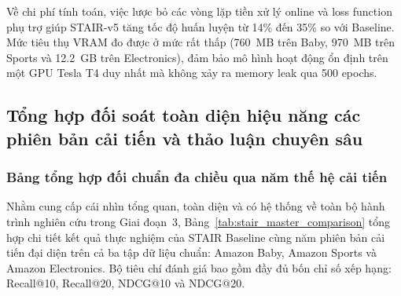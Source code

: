 Về chi phí tính toán, việc lược bỏ các vòng lặp tiền xử lý online và loss function phụ trợ giúp STAIR-v5 tăng tốc độ huấn luyện từ 14\% đến 35\% so với Baseline. Mức tiêu thụ VRAM đo được ở mức rất thấp (760~MB trên Baby, 970~MB trên Sports và 12.2~GB trên Electronics), đảm bảo mô hình hoạt động ổn định trên một GPU Tesla T4 duy nhất mà không xảy ra memory leak qua 500 epochs.

\subsection{Tổng hợp đối soát toàn diện hiệu năng các phiên bản cải tiến và thảo luận chuyên sâu}

\subsubsection{Bảng tổng hợp đối chuẩn đa chiều qua năm thế hệ cải tiến}

Nhằm cung cấp cái nhìn tổng quan, toàn diện và có hệ thống về toàn bộ hành trình nghiên cứu trong Giai đoạn~3, Bảng~\ref{tab:stair_master_comparison} tổng hợp chi tiết kết quả thực nghiệm của STAIR Baseline cùng năm phiên bản cải tiến đại diện trên cả ba tập dữ liệu chuẩn: Amazon Baby, Amazon Sports và Amazon Electronics. Bộ tiêu chí đánh giá bao gồm đầy đủ bốn chỉ số xếp hạng: Recall@10, Recall@20, NDCG@10 và NDCG@20.

